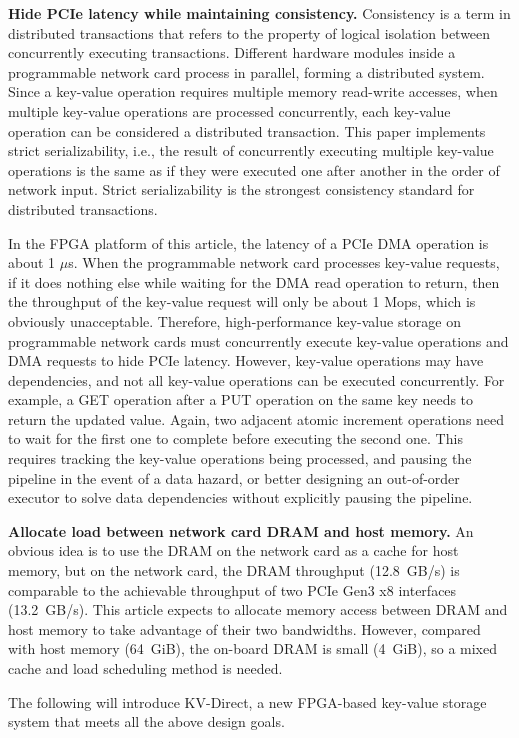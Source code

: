 \textbf{Hide PCIe latency while maintaining consistency.} Consistency is a term in distributed transactions that refers to the property of logical isolation between concurrently executing transactions. Different hardware modules inside a programmable network card process in parallel, forming a distributed system. Since a key-value operation requires multiple memory read-write accesses, when multiple key-value operations are processed concurrently, each key-value operation can be considered a distributed transaction. This paper implements strict serializability, i.e., the result of concurrently executing multiple key-value operations is the same as if they were executed one after another in the order of network input. Strict serializability is the strongest consistency standard for distributed transactions.

In the FPGA platform of this article, the latency of a PCIe DMA operation is about 1 $\mu$s. When the programmable network card processes key-value requests, if it does nothing else while waiting for the DMA read operation to return, then the throughput of the key-value request will only be about 1 Mops, which is obviously unacceptable.
Therefore, high-performance key-value storage on programmable network cards must concurrently execute key-value operations and DMA requests to hide PCIe latency.
However, key-value operations may have dependencies, and not all key-value operations can be executed concurrently.
For example, a GET operation after a PUT operation on the same key needs to return the updated value.
Again, two adjacent atomic increment operations need to wait for the first one to complete before executing the second one.
This requires tracking the key-value operations being processed, and pausing the pipeline in the event of a data hazard, or better designing an out-of-order executor to solve data dependencies without explicitly pausing the pipeline.


\textbf {Allocate load between network card DRAM and host memory.}
An obvious idea is to use the DRAM on the network card as a cache for host memory, but on the network card, the DRAM throughput (12.8~GB/s) is comparable to the achievable throughput of two PCIe Gen3 x8 interfaces (13.2~GB/s).
This article expects to allocate memory access between DRAM and host memory to take advantage of their two bandwidths.
However, compared with host memory (64~GiB), the on-board DRAM is small (4~GiB), so a mixed cache and load scheduling method is needed.

The following will introduce KV-Direct, a new FPGA-based key-value storage system that meets all the above design goals.
